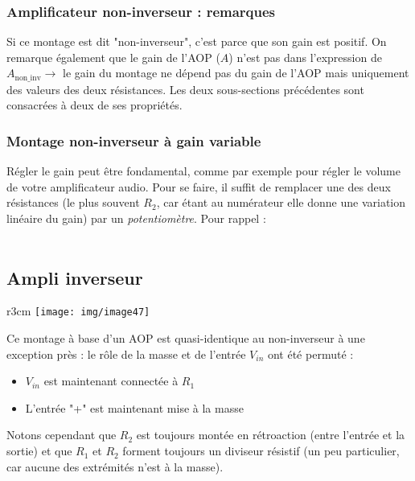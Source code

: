 \subsubsection{Amplificateur non-inverseur : remarques}
Si ce montage est dit "non-inverseur", c'est parce que son gain est positif. On remarque également que le gain de l'AOP ($A$) n'est pas dans l'expression de $A_{\text{non\_inv}} \rightarrow$ le gain du montage ne dépend pas du gain de l'AOP mais uniquement des valeurs des deux résistances. Les deux sous-sections précédentes sont consacrées à deux de ses propriétés.

\subsubsection{Montage non-inverseur à gain variable}
Régler le gain peut être fondamental, comme par exemple pour régler le volume de votre amplificateur audio. Pour se faire, il suffit de remplacer une des deux résistances (le plus souvent $R_2$, car étant au numérateur elle donne une variation linéaire du gain) par un \textit{potentiomètre}. Pour rappel :\\

\ \\




\subsection{Ampli inverseur}
\begin{wrapfigure}[7]{r}{3cm}
	\texttt{[image: img/image47]}
\end{wrapfigure}
Ce montage à base d'un AOP est quasi-identique au non-inverseur à une exception près : le rôle de la masse et de l'entrée $V_{in}$ ont été permuté :
\begin{itemize}
	\item $V_{in}$ est maintenant connectée à $R_1$
	\item L'entrée "+" est maintenant mise à la masse
\end{itemize}
Notons cependant que $R_2$ est toujours montée en rétroaction (entre l'entrée et la sortie) et que $R_1$ et $R_2$ forment toujours un diviseur résistif (un peu particulier, car aucune des extrémités n'est à la masse).

